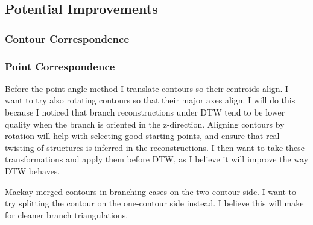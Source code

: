 \documentclass[10pt]{article}
\begin{document}
\subsection{Potential Improvements}

\subsubsection{Contour Correspondence}

\subsubsection{Point Correspondence}

Before the point angle method I translate contours so their centroids align. I want to try also rotating contours so that their major axes align. I will do this because I noticed that branch reconstructions under DTW tend to be lower quality when the branch is oriented in the z-direction. Aligning contours by rotation will help with selecting good starting points, and ensure that real twisting of structures is inferred in the reconstructions. I then want to take these transformations and apply them before DTW, as I believe it will improve the way DTW behaves.

Mackay merged contours in branching cases on the two-contour side. I want to try splitting the contour on the one-contour side instead. I believe this will make for cleaner branch triangulations.

\pagebreak


\end{document}

